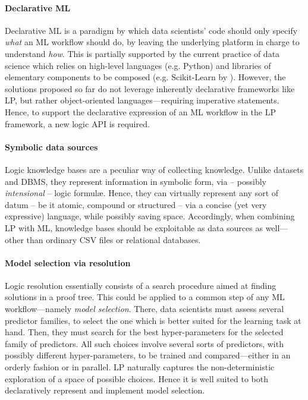 \documentclass{article}
\begin{document}
\paragraph{Declarative ML} Declarative ML is a paradigm by which data scientists' code should only specify \emph{what} an ML workflow should do, by leaving the underlying platform in charge to understand \emph{how}.
%
This is partially supported by the current practice of data science which relies on high-level languages (e.g. Python) and libraries of elementary components to be composed (e.g. Scikit-Learn by ).
%
However, the solutions proposed so far do not leverage inherently declarative frameworks like LP, but rather object-oriented languages---requiring imperative statements.
%
Hence, to support the declarative expression of an ML workflow in the LP framework, a new logic API is required.
%

\paragraph{Symbolic data sources}
%
Logic knowledge bases are a peculiar way of collecting knowledge.
%
Unlike datasets and DBMS, they represent information in symbolic form, via -- possibly \emph{intensional} -- logic formul\ae{}.
%
Hence, they can virtually represent any sort of datum -- be it atomic, compound or structured -- via a concise (yet very expressive) language, while possibly saving space.
%
Accordingly, when combining LP with ML, knowledge bases should be exploitable as data sources as well---other than ordinary CSV files or relational databases.

\paragraph{Model selection via resolution}
%
Logic resolution essentially consists of a search procedure aimed at finding solutions in a proof tree.
%
This could be applied to a common step of any ML workflow---namely \emph{model selection}.
%
There, data scientists must assess several predictor families, to select the one which is better suited for the learning task at hand.
%
Then, they must search for the best hyper-parameters for the selected family of predictors.
%
All such choices involve several sorts of predictors, with possibly different hyper-parameters, to be trained and compared---either in an orderly fashion or in parallel.
%
LP naturally captures the non-deterministic exploration of a space of possible choices.
%
Hence it is well suited to both declaratively represent and implement model selection.
\end{document}
